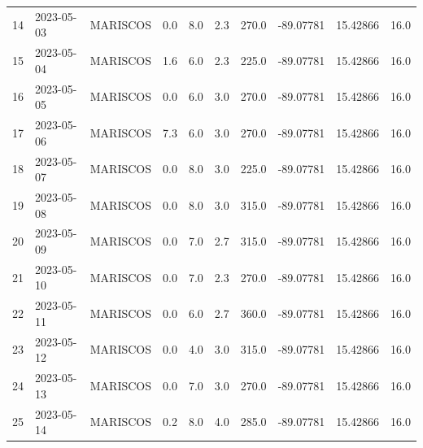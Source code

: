 \documentclass[12pt]{article}
\begin{document}
\begin{center}
\begin{tabular}{lllrrrrrrr}
14  & 2023-05-03 &  MARISCOS &     0.0 &  8.0 &         2.3 &       270.0 & -89.07781 &  15.42866 &     16.0 \\
15  & 2023-05-04 &  MARISCOS &     1.6 &  6.0 &         2.3 &       225.0 & -89.07781 &  15.42866 &     16.0 \\
16  & 2023-05-05 &  MARISCOS &     0.0 &  6.0 &         3.0 &       270.0 & -89.07781 &  15.42866 &     16.0 \\
17  & 2023-05-06 &  MARISCOS &     7.3 &  6.0 &         3.0 &       270.0 & -89.07781 &  15.42866 &     16.0 \\
18  & 2023-05-07 &  MARISCOS &     0.0 &  8.0 &         3.0 &       225.0 & -89.07781 &  15.42866 &     16.0 \\
19  & 2023-05-08 &  MARISCOS &     0.0 &  8.0 &         3.0 &       315.0 & -89.07781 &  15.42866 &     16.0 \\
20  & 2023-05-09 &  MARISCOS &     0.0 &  7.0 &         2.7 &       315.0 & -89.07781 &  15.42866 &     16.0 \\
21  & 2023-05-10 &  MARISCOS &     0.0 &  7.0 &         2.3 &       270.0 & -89.07781 &  15.42866 &     16.0 \\
22  & 2023-05-11 &  MARISCOS &     0.0 &  6.0 &         2.7 &       360.0 & -89.07781 &  15.42866 &     16.0 \\
23  & 2023-05-12 &  MARISCOS &     0.0 &  4.0 &         3.0 &       315.0 & -89.07781 &  15.42866 &     16.0 \\
24  & 2023-05-13 &  MARISCOS &     0.0 &  7.0 &         3.0 &       270.0 & -89.07781 &  15.42866 &     16.0 \\
25  & 2023-05-14 &  MARISCOS &     0.2 &  8.0 &         4.0 &       285.0 & -89.07781 &  15.42866 &     16.0 \\
\bottomrule
\end{tabular}

        
        \end{center}
        
\end{document}
